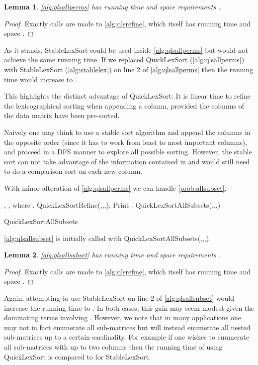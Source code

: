 \documentclass[a4paper,10pt,reqno]{amsart}
\newtheorem{lemma}{Lemma}
\theoremstyle{definition}
\begin{document}
\begin{lemma}
    \autoref{alg:qlsallperms} has running time  and space requirements .
\end{lemma}
\begin{proof}
    Exactly  calls are made to \autoref{alg:qlsrefine}, which itself has running time and space .
\end{proof}

As it stands, StableLexSort could be used  
inside \autoref{alg:qlsallperms} but would not achieve the same running time.
If we replaced QuickLexSort (\autoref{alg:qlsallperms}) with StableLexSort (\autoref{alg:stablelex}) on
line 2 of \autoref{alg:qlsallperms} then the running time would
increase to .

This highlights the distinct advantage of QuickLexSort: It is linear time to
refine the lexicographical sorting when appending a column, provided the
columns of the data matrix have been pre-sorted.

Naively one may think to use a stable sort algorithm and append the columns in
the opposite order (since it has to work from least to most important columns),
and proceed in a DFS manner to explore all possible sorting. However, the
stable sort can not take advantage of the information contained in  and
would still need to do a comparison sort on each new column. 

With minor alteration of \autoref{alg:qlsallperms} we can handle \autoref{prob:allsubset}.

\begin{algorithm}
\begin{algorithmic}[1]
    \REQUIRE , ,  where  .
        \STATE QuickLexSortRefine(,,,).
        \STATE Print .
        \STATE QuickLexSortAllSubsets(,,,)
    \ENDFOR
\end{algorithmic}
\caption{QuickLexSortAllSubsets}
\label{alg:qlsallsubset}
\end{algorithm}

\autoref{alg:qlsallsubset} is initially called with QuickLexSortAllSubsets(,,,).

\begin{lemma}
    \autoref{alg:qlsallsubset} has running time  and space requirements .
\end{lemma}
\begin{proof}
    Exactly  calls are made to \autoref{alg:qlsrefine}, which itself has running time and space .
\end{proof}

Again, attempting to use StableLexSort on line 2 of \autoref{alg:qlsallsubset}
would increase the running time to . In both cases, this gain
may seem modest given the dominating terms involving . However, we note that
in many applications one may not in fact enumerate all sub-matrices but will
instead enumerate all nested sub-matrices up to a certain cardinality.  For
example if one wishes to enumerate all sub-matrices with up to two columns
then the running time of using QuickLexSort is  compared to  
for StableLexSort.
\end{document}
